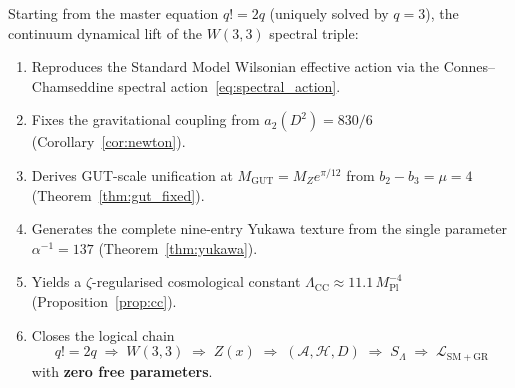 \begin{tcolorbox}[colback=green!4!white,colframe=green!55!black,
  title=\textbf{Part~XXIII Closing Theorem}]
\begin{theorem}
\label{thm:closure}
Starting from the master equation $q!=2q$ (uniquely solved by $q=3$),
the continuum dynamical lift of the $W(3,3)$ spectral triple:
\begin{enumerate}[nosep]
  \item Reproduces the Standard Model Wilsonian effective action via the
        Connes--Chamseddine spectral action~\eqref{eq:spectral_action}.
  \item Fixes the gravitational coupling from $a_2(D^2)=830/6$
        (Corollary~\ref{cor:newton}).
  \item Derives GUT-scale unification at $M_\mathrm{GUT}=M_Z e^{\pi/12}$
        from $b_2-b_3=\mu=4$ (Theorem~\ref{thm:gut_fixed}).
  \item Generates the complete nine-entry Yukawa texture from the single
        parameter $\alpha^{-1}=137$ (Theorem~\ref{thm:yukawa}).
  \item Yields a $\zeta$-regularised cosmological constant
        $\Lambda_\mathrm{CC}\approx 11.1\,M_\mathrm{Pl}^{-4}$
        (Proposition~\ref{prop:cc}).
  \item Closes the logical chain
        \[
          q!=2q \;\Rightarrow\; W(3,3) \;\Rightarrow\; Z(x)
          \;\Rightarrow\; (\mathcal{A},\mathcal{H},D)
          \;\Rightarrow\; S_\Lambda \;\Rightarrow\; \mathcal{L}_\mathrm{SM+GR}
        \]
        with \textbf{zero free parameters}.
\end{enumerate}
\end{theorem}
\end{tcolorbox}

